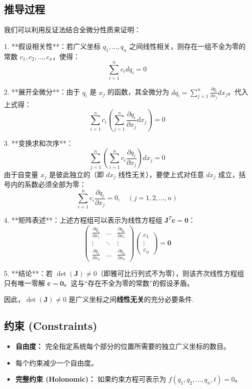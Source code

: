 \documentclass[11pt,a4paper]{article}
\begin{document}
\subsection*{推导过程}

我们可以利用反证法结合全微分性质来证明：

1. **假设相关性**：若广义坐标 $q_1, \dots, q_n$ 之间线性相关，则存在一组不全为零的常数 $c_1, c_2, \dots, c_n$，使得：
   \[ \sum_{i=1}^n c_i dq_i = 0 \]

2. **展开全微分**：由于 $q_i$ 是 $x_j$ 的函数，其全微分为 $dq_i = \sum_{j=1}^n \frac{\partial q_i}{\partial x_j} dx_j$。代入上式得：
   \[ \sum_{i=1}^n c_i \left( \sum_{j=1}^n \frac{\partial q_i}{\partial x_j} dx_j \right) = 0 \]

3. **变换求和次序**：
   \[ \sum_{j=1}^n \left( \sum_{i=1}^n c_i \frac{\partial q_i}{\partial x_j} \right) dx_j = 0 \]
   由于自变量 $x_j$ 是彼此独立的（即 $dx_j$ 线性无关），要使上式对任意 $dx_j$ 成立，括号内的系数必须全部为零：
   \[ \sum_{i=1}^n c_i \frac{\partial q_i}{\partial x_j} = 0, \quad (j=1, 2, \dots, n) \]

4. **矩阵表述**：上述方程组可以表示为线性方程组 $\mathbf{J}^T \mathbf{c} = \mathbf{0}$：
   \[
   \begin{pmatrix} 
   \frac{\partial q_1}{\partial x_1} & \dots & \frac{\partial q_n}{\partial x_1} \\
   \vdots & \ddots & \vdots \\
   \frac{\partial q_1}{\partial x_n} & \dots & \frac{\partial q_n}{\partial x_n} 
   \end{pmatrix}
   \begin{pmatrix} c_1 \\ \vdots \\ c_n \end{pmatrix} = \mathbf{0}
   \]
   
5. **结论**：若 $\det(\mathbf{J}) \neq 0$（即雅可比行列式不为零），则该齐次线性方程组只有唯一零解 $\mathbf{c} = \mathbf{0}$。这与“存在不全为零的常数”的假设矛盾。

因此，$\det(\mathbf{J}) \neq 0$ 是广义坐标之间\textbf{线性无关}的充分必要条件.



\subsection{约束 (Constraints)}
\begin{itemize}
    \item \textbf{自由度：} 完全指定系统每个部分的位置所需要的独立广义坐标的数目。
    \item 每个约束减少一个自由度。
    \item \textbf{完整约束 (Holonomic)：} 如果约束方程可表示为 $f(q_1, q_2, \dots, q_n, t) = 0$。
\end{itemize}
\end{document}
